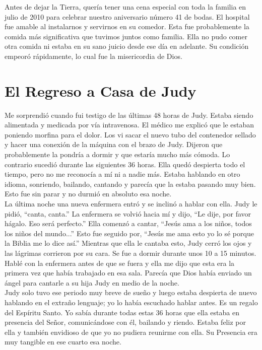 \documentclass[twoside, 12pt]{book}
\begin{document}
Antes de dejar la Tierra, quería tener una cena especial con toda la familia en julio de 2010 para celebrar nuestro aniversario número 41 de bodas. El hospital fue amable al instalarnos y servirnos en su comedor. Esta fue probablemente la comida más significativa que tuvimos juntos como familia. Ella no pudo comer otra comida ni estaba en su sano juicio desde ese día en adelante. Su condición empeoró rápidamente, lo cual fue la misericordia de Dios.\\
 
\section{El Regreso a Casa de Judy}
 
Me sorprendió cuando fui testigo de las últimas 48 horas de Judy. Estaba siendo alimentada y medicada por vía intravenosa. El médico me explicó que le estaban poniendo morfina para el dolor. Los vi sacar el nuevo tubo del contenedor sellado y hacer una conexión de la máquina con el brazo de Judy. Dijeron que probablemente la pondría a dormir y que estaría mucho más cómoda. Lo contrario sucedió durante las siguientes 36 horas. Ella quedó despierta todo el tiempo, pero no me reconocía a mí ni a nadie más. Estaba hablando en otro idioma, sonriendo, bailando, cantando y parecía que la estaba pasando muy bien. Esto fue sin parar y no durmió en absoluto esa noche.\\
 
La última noche una nueva enfermera entró y se inclinó a hablar con ella. Judy le pidió, “canta, canta.” La enfermera se volvió hacia mí y dijo, “Le dije, por favor hágalo. Eso será perfecto.”  Ella comenzó a cantar, “Jesús ama a los niños, todos los niños del mundo...” Esto fue seguido por, “Jesús me ama esto yo lo sé porque la Biblia me lo dice así.” Mientras que ella le cantaba esto, Judy cerró los ojos y las lágrimas corrieron por su cara. Se fue a dormir durante unos 10 a 15 minutos. Hablé con la enfermera antes de que se fuera y ella me dijo que esta era la primera vez que había trabajado en esa sala. Parecía que Dios había enviado un ángel para cantarle a su hija Judy en medio de la noche.\\
 
Judy solo tuvo ese periodo muy breve de sueño y luego estaba despierta de nuevo hablando en el extraño lenguaje; yo lo había escuchado hablar antes. Es un regalo del Espíritu Santo. Yo sabía durante todas estas 36 horas que ella estaba en presencia del Señor, comunicándose con él, bailando y riendo. Estaba feliz por ella y también envidioso de que yo no pudiera reunirme con ella. Su Presencia era muy tangible en ese cuarto esa noche.\\
 
\end{document}
